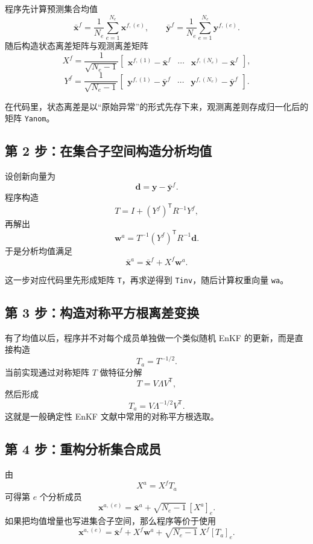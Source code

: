 \documentclass[12pt,a4paper]{article}
\begin{document}
程序先计算预测集合均值
\[
\bar{\mathbf{x}}^f
= \frac{1}{N_e}\sum_{e=1}^{N_e}\mathbf{x}^{f,(e)},
\qquad
\bar{\mathbf{y}}^f
= \frac{1}{N_e}\sum_{e=1}^{N_e}\mathbf{y}^{f,(e)}.
\]
随后构造状态离差矩阵与观测离差矩阵
\[
X^f
= \frac{1}{\sqrt{N_e-1}}
\begin{bmatrix}
\mathbf{x}^{f,(1)}-\bar{\mathbf{x}}^f &
\cdots &
\mathbf{x}^{f,(N_e)}-\bar{\mathbf{x}}^f
\end{bmatrix},
\]
\[
Y^f
= \frac{1}{\sqrt{N_e-1}}
\begin{bmatrix}
\mathbf{y}^{f,(1)}-\bar{\mathbf{y}}^f &
\cdots &
\mathbf{y}^{f,(N_e)}-\bar{\mathbf{y}}^f
\end{bmatrix}.
\]

在代码里，状态离差是以“原始异常”的形式先存下来，观测离差则存成归一化后的矩阵 \texttt{Yanom}。

\subsection{第 2 步：在集合子空间构造分析均值}

设创新向量为
\[
\mathbf{d} = \mathbf{y} - \bar{\mathbf{y}}^f.
\]
程序构造
\[
T = I + (Y^f)^{\mathsf T} R^{-1} Y^f,
\]
再解出
\[
\mathbf{w}^a
= T^{-1}(Y^f)^{\mathsf T}R^{-1}\mathbf{d}.
\]
于是分析均值满足
\[
\bar{\mathbf{x}}^a = \bar{\mathbf{x}}^f + X^f \mathbf{w}^a.
\]

这一步对应代码里先形成矩阵 \texttt{T}，再求逆得到 \texttt{Tinv}，随后计算权重向量 \texttt{wa}。

\subsection{第 3 步：构造对称平方根离差变换}

有了均值以后，程序并不对每个成员单独做一个类似随机 EnKF 的更新，而是直接构造
\[
T_a = T^{-1/2}.
\]
当前实现通过对称矩阵 $T$ 做特征分解
\[
T = V \Lambda V^{\mathsf T},
\]
然后形成
\[
T_a = V \Lambda^{-1/2} V^{\mathsf T}.
\]
这就是一般确定性 EnKF 文献中常用的对称平方根选取。

\subsection{第 4 步：重构分析集合成员}

由
\[
X^a = X^f T_a
\]
可得第 $e$ 个分析成员
\[
\mathbf{x}^{a,(e)}
= \bar{\mathbf{x}}^a + \sqrt{N_e-1}\,[X^a]_e.
\]
如果把均值增量也写进集合子空间，那么程序等价于使用
\[
\mathbf{x}^{a,(e)}
= \bar{\mathbf{x}}^f
+ X^f \mathbf{w}^a
+ \sqrt{N_e-1}\,X^f [T_a]_e.
\]
\end{document}
